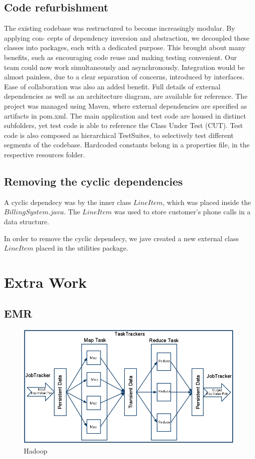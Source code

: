 \documentclass[11pt,twocolumn]{article} %
\begin{document}
\subsection{Code refurbishment}
The existing codebase was restructured to become increasingly modular. By applying con-
cepts of dependency inversion and abstraction, we decoupled these classes into packages,
each with a dedicated purpose.
This brought about many benefits, such as encouraging code reuse and making testing
convenient. Our team could now work simultaneously and asynchronously. Integration
would be almost painless, due to a clear separation of concerns, introduced by interfaces.
Ease of collaboration was also an added benefit.
Full details of external dependencies as well as an architecture diagram, are available for reference.
The project was managed using Maven, where external dependencies are specified as
artifacts in pom.xml. The main application and test code are housed in distinct subfolders,
yet test code is able to reference the Class Under Test (CUT). Test code is also composed
as hierarchical TestSuites, to selectively test different segments of the codebase. Hardcoded
constants belong in a properties file, in the respective resources folder.

\subsection{Removing the cyclic dependencies}
A cyclic dependecy was by the inner class $LineItem$, which was placed inside the $BillingSystem.java$.
The $LineItem$ was used to store customer's phone calls in a data structure.

In order to remove the cyclic dependecy, we jave created a new external class $LineItem$ placed in the 
utilities package.

\section{Extra Work}
\subsection{EMR}
\begin{figure}[ht]
\includegraphics[scale=0.25]{hadoop.png}
\caption{Hadoop \cite{hadoop}}
\end{figure}
\end{document}

